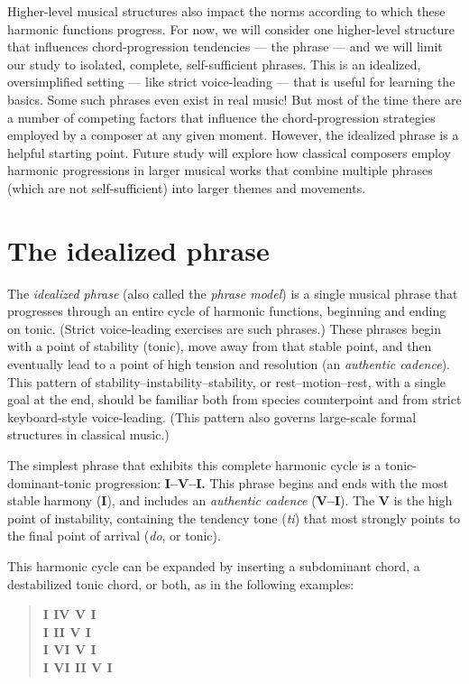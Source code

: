 \documentclass{book}
\begin{document}
Higher-level musical structures also impact the norms according to which these
harmonic functions progress. For now, we will consider one higher-level
structure that influences chord-progression tendencies --- the phrase --- and
we will limit our study to isolated, complete, self-sufficient phrases. This
is an idealized, oversimplified setting --- like strict voice-leading --- that
is useful for learning the basics. Some such phrases even exist in real music!
But most of the time there are a number of competing factors that influence
the chord-progression strategies employed by a composer at any given moment.
However, the idealized phrase is a helpful starting point. Future study will
explore how classical composers employ harmonic progressions in larger musical
works that combine multiple phrases (which are not self-sufficient) into
larger themes and movements.

\hypertarget{the-idealized-phrase}{%
\section{The idealized phrase}\label{the-idealized-phrase}}

The \emph{idealized phrase} (also called the \emph{phrase model}) is a single
musical phrase that progresses through an entire cycle of harmonic functions,
beginning and ending on tonic. (Strict voice-leading exercises are such
phrases.) These phrases begin with a point of stability (tonic), move away
from that stable point, and then eventually lead to a point of high tension
and resolution (an \emph{authentic cadence}). This pattern of
stability--instability--stability, or rest--motion--rest, with a single goal
at the end, should be familiar both from species counterpoint and from strict
keyboard-style voice-leading. (This pattern also governs large-scale formal
structures in classical music.)

The simplest phrase that exhibits this complete harmonic cycle is a
tonic-dominant-tonic progression: \textbf{I--V--I.} This phrase begins and
ends with the most stable harmony (\textbf{I}), and includes an
\emph{authentic cadence} (\textbf{V--I}). The \textbf{V} is the high point of
instability, containing the tendency tone (\emph{ti}) that most strongly
points to the final point of arrival (\emph{do}, or tonic).

This harmonic cycle can be expanded by inserting a subdominant chord, a
destabilized tonic chord, or both, as in the following examples:

\begin{quote}
\textbf{I IV V I}\\
\textbf{I II V I}\\
\textbf{I VI V I}\\
\textbf{I VI II V I}
\end{quote}
\end{document}
